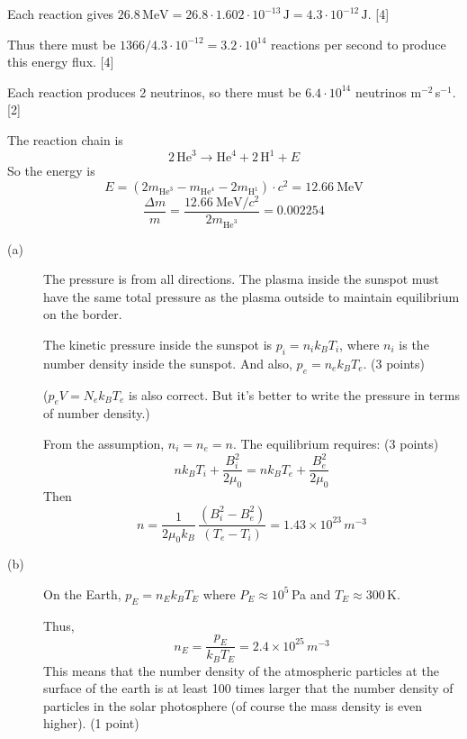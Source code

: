 Each reaction gives
$26.8\,\mathrm{MeV} = 26.8 \cdot 1.602 \cdot 10^{-13}\,\mathrm{J}
= 4.3 \cdot 10^{-12}\,\mathrm{J}$. \hfill[4]

Thus there must be $1366 / 4.3 \cdot 10^{-12} = 3.2 \cdot 10^{14}$ reactions per
second to produce this energy flux. \hfill[4]

Each reaction produces 2 neutrinos, so there must be
$6.4 \cdot 10^{14}$ neutrinos m$^{-2}\,$s$^{-1}$. \hfill[2]

The reaction chain is
\[
2\,\mathrm{He}^{3} \rightarrow \mathrm{He}^{4} + 2\,\mathrm{H}^{1} + E
\]
So the energy is
\begin{equation*}
E = \left(2m_{\mathrm{He}^{3}} - m_{\mathrm{He}^{4}} - 2m_{\mathrm{H}^{1}}\right)\cdot c^{2}
= 12.66~\mathrm{MeV} \tag*{(7 pt)}
\end{equation*}
\begin{equation*}
\frac{\Delta m}{m} = \frac{12.66~\mathrm{MeV}/c^{2}}{2m_{\mathrm{He}^{3}}} = 0.002254 \tag*{(3 pt)}
\end{equation*}

\begin{description}
\item[(a)] The pressure is from all directions. The plasma inside the sunspot
  must have the same total pressure as the plasma outside to maintain
  equilibrium on the border.

  The kinetic pressure inside the sunspot is $p_i = n_i k_B T_i$, where $n_i$
  is the number density inside the sunspot. And also,
  $p_e = n_e k_B T_e$. \hfill(3 points)

  ($p_e V = N_e k_B T_e$ is also correct. But it's better to write the
  pressure in terms of number density.)

  From the assumption, $n_i = n_e = n$. The equilibrium
  requires: \hfill(3 points)
  \begin{equation*}
  n k_B T_i + \frac{B_i^2}{2\mu_0} = n k_B T_e + \frac{B_e^2}{2\mu_0}
  \tag*{(8 points)}
  \end{equation*}
  Then
  \begin{equation*}
  n = \frac{1}{2\mu_0 k_B}\,\frac{(B_i^2 - B_e^2)}{(T_e - T_i)}
    = 1.43 \times 10^{23}\,m^{-3}
  \tag*{(6 points)}
  \end{equation*}
\item[(b)] On the Earth, $p_E = n_E k_B T_E$ where $P_E \approx 10^5$\,Pa and
  $T_E \approx 300$\,K.

  Thus,
  \begin{equation*}
  n_E = \frac{p_E}{k_B T_E} = 2.4 \times 10^{25}\,m^{-3}
  \tag*{(4 points)}
  \end{equation*}
  This means that the number density of the atmospheric particles at the
  surface of the earth is at least 100 times larger that the number density of
  particles in the solar photosphere (of course the mass density is even
  higher). \hfill(1 point)
\end{description}

